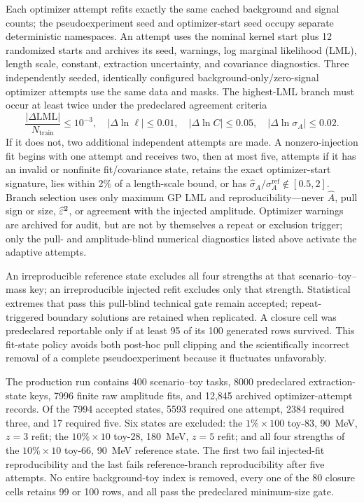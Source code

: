 Each optimizer attempt refits exactly the same cached background and signal counts;
the pseudoexperiment seed and optimizer-start seed occupy separate deterministic
namespaces.  An attempt uses the nominal kernel start plus 12 randomized starts and
archives its seed, warnings, log marginal likelihood (LML), length scale, constant,
extraction uncertainty, and covariance diagnostics.  Three independently seeded,
identically configured background-only/zero-signal optimizer attempts use the same
data and masks.  The highest-LML branch
must occur at least twice under the predeclared agreement criteria
\begin{equation}
 \frac{|\Delta\mathrm{LML}|}{N_{\mathrm{train}}}\leq10^{-3},\quad
 |\Delta\ln\ell|\leq0.01,\quad
 |\Delta\ln C|\leq0.05,\quad
 |\Delta\ln\sigma_A|\leq0.02.
 \label{eq:v501-v4p6-branch-replication}
\end{equation}
If it does not, two additional independent attempts are made.  A nonzero-injection
fit begins with one attempt and receives two, then at most five, attempts if it has an
invalid or nonfinite fit/covariance state, retains the exact optimizer-start signature, lies
within 2\% of a length-scale bound, or has
$\widehat\sigma_A/\sigma_A^{\mathrm{ref}}\notin[0.5,2]$.  Branch selection uses only
maximum GP LML and reproducibility---never $\widehat A$, pull sign or size,
$\widehat{\varepsilon}^2$, or agreement with the injected amplitude.
Optimizer warnings are archived for audit, but are not by themselves a repeat or
exclusion trigger; only the pull- and amplitude-blind numerical diagnostics listed above
activate the adaptive attempts.

An irreproducible reference state excludes all four strengths at that
scenario--toy--mass key; an irreproducible injected refit excludes only that strength.
Statistical extremes that pass this pull-blind technical gate remain accepted;
repeat-triggered boundary solutions are retained when replicated.  A closure cell
was predeclared reportable only if at least 95 of its 100 generated rows survived.
This fit-state policy avoids both post-hoc pull clipping and the scientifically
incorrect removal of a complete pseudoexperiment because it fluctuates unfavorably.

The production run contains 400 scenario--toy tasks, 8000 predeclared extraction-state
keys, 7996 finite raw amplitude fits, and 12,845 archived optimizer-attempt records.
Of the 7994 accepted states,
5593 required one attempt, 2384 required three, and 17 required five.  Six states are
excluded: the $1\%\times100$ toy-83, 90~MeV, $z=3$ refit; the $10\%\times10$
toy-28, 180~MeV, $z=5$ refit; and all four strengths of the $10\%\times10$ toy-66,
90~MeV reference state.  The first two fail injected-fit reproducibility and the last
fails reference-branch reproducibility after five attempts.  No entire background-toy
index is removed, every one of the 80 closure cells retains 99 or 100 rows, and all pass the
predeclared minimum-size gate.

